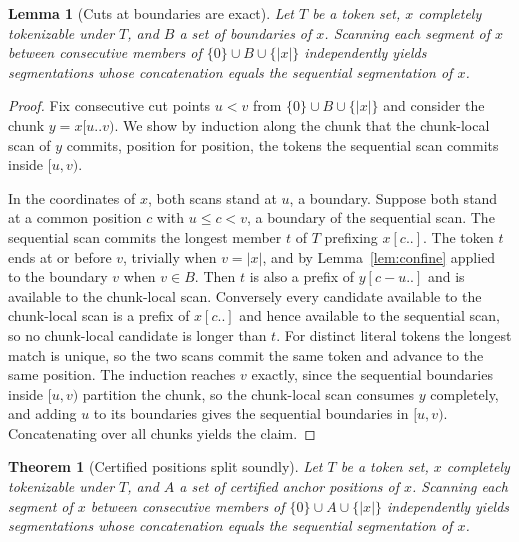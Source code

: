 \documentclass[11pt,a4paper]{article}
\theoremstyle{definition}
\theoremstyle{plain}
\newtheorem{theorem}{Theorem}
\newtheorem{lemma}{Lemma}
\begin{document}
\begin{lemma}[Cuts at boundaries are exact]\label{lem:cut}
Let $T$ be a token set, $x$ completely tokenizable under $T$, and $B$ a set of boundaries of $x$. Scanning each segment
of $x$ between consecutive members of $\{0\} \cup B \cup \{|x|\}$ independently yields segmentations whose concatenation
equals the sequential segmentation of $x$.
\end{lemma}

\begin{proof}
Fix consecutive cut points $u < v$ from $\{0\} \cup B \cup \{|x|\}$ and consider the chunk $y = x[u..v)$. We show by
induction along the chunk that the chunk-local scan of $y$ commits, position for position, the tokens the sequential
scan commits inside $[u, v)$.

In the coordinates of $x$, both scans stand at $u$, a boundary. Suppose both stand at a common position $c$ with
$u \le c < v$, a boundary of the sequential scan. The sequential scan commits the longest member $t$ of $T$ prefixing
$x[c..]$. The token $t$ ends at or before $v$, trivially when $v = |x|$, and by Lemma~\ref{lem:confine} applied to the
boundary $v$ when $v \in B$. Then $t$ is also a prefix of $y[c-u..]$ and is available to the chunk-local scan.
Conversely every candidate available to the chunk-local scan is a prefix of $x[c..]$ and hence available to the
sequential scan, so no chunk-local candidate is longer than $t$. For distinct literal tokens the longest match is
unique, so the two scans commit the same token and advance to the same position. The induction reaches $v$ exactly,
since the sequential boundaries inside $[u, v)$ partition the chunk, so the chunk-local scan consumes $y$ completely,
and adding $u$ to its boundaries gives the sequential boundaries in $[u, v)$. Concatenating over all chunks yields the
claim.
\end{proof}

\begin{theorem}[Certified positions split soundly]\label{thm:split}
Let $T$ be a token set, $x$ completely tokenizable under $T$, and $A$ a set of certified anchor positions of $x$.
Scanning each segment of $x$ between consecutive members of $\{0\} \cup A \cup \{|x|\}$ independently yields
segmentations whose concatenation equals the sequential segmentation of $x$.
\end{theorem}
\end{document}
